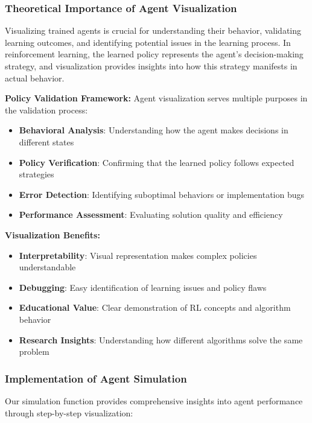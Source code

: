 \documentclass[12pt]{article}
\begin{document}
{{{\subsubsection{Theoretical Importance of Agent Visualization}

Visualizing trained agents is crucial for understanding their behavior, validating learning outcomes, and identifying potential issues in the learning process. In reinforcement learning, the learned policy represents the agent's decision-making strategy, and visualization provides insights into how this strategy manifests in actual behavior.

\textbf{Policy Validation Framework:}
Agent visualization serves multiple purposes in the validation process:

\begin{itemize}
    \item \textbf{Behavioral Analysis}: Understanding how the agent makes decisions in different states
    \item \textbf{Policy Verification}: Confirming that the learned policy follows expected strategies
    \item \textbf{Error Detection}: Identifying suboptimal behaviors or implementation bugs
    \item \textbf{Performance Assessment}: Evaluating solution quality and efficiency
\end{itemize}

\textbf{Visualization Benefits:}
\begin{itemize}
    \item \textbf{Interpretability}: Visual representation makes complex policies understandable
    \item \textbf{Debugging}: Easy identification of learning issues and policy flaws
    \item \textbf{Educational Value}: Clear demonstration of RL concepts and algorithm behavior
    \item \textbf{Research Insights}: Understanding how different algorithms solve the same problem
\end{itemize}

\subsubsection{Implementation of Agent Simulation}

Our simulation function provides comprehensive insights into agent performance through step-by-step visualization:

}}}
\end{document}
